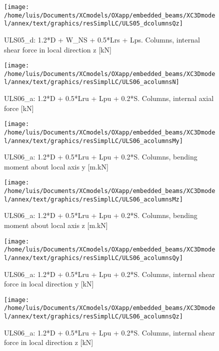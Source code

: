 \begin{figure}
\begin{center}
\texttt{[image: /home/luis/Documents/XCmodels/OXapp/embedded\_beams/XC3Dmodel/annex/text/graphics/resSimplLC/ULS05\_dcolumnsQz]}
\caption{ULS05_d: 1.2*D + W_NS + 0.5*Lrs + Lps. Columns, internal shear force in local direction z [kN]}
\end{center}
\end{figure}
\clearpage
\begin{figure}
\begin{center}
\texttt{[image: /home/luis/Documents/XCmodels/OXapp/embedded\_beams/XC3Dmodel/annex/text/graphics/resSimplLC/ULS06\_acolumnsN]}
\caption{ULS06_a: 1.2*D + 0.5*Lru + Lpu + 0.2*S. Columns, internal axial force [kN]}
\end{center}
\end{figure}
\begin{figure}
\begin{center}
\texttt{[image: /home/luis/Documents/XCmodels/OXapp/embedded\_beams/XC3Dmodel/annex/text/graphics/resSimplLC/ULS06\_acolumnsMy]}
\caption{ULS06_a: 1.2*D + 0.5*Lru + Lpu + 0.2*S. Columns, bending moment about local axis y [m.kN]}
\end{center}
\end{figure}
\begin{figure}
\begin{center}
\texttt{[image: /home/luis/Documents/XCmodels/OXapp/embedded\_beams/XC3Dmodel/annex/text/graphics/resSimplLC/ULS06\_acolumnsMz]}
\caption{ULS06_a: 1.2*D + 0.5*Lru + Lpu + 0.2*S. Columns, bending moment about local axis z [m.kN]}
\end{center}
\end{figure}
\begin{figure}
\begin{center}
\texttt{[image: /home/luis/Documents/XCmodels/OXapp/embedded\_beams/XC3Dmodel/annex/text/graphics/resSimplLC/ULS06\_acolumnsQy]}
\caption{ULS06_a: 1.2*D + 0.5*Lru + Lpu + 0.2*S. Columns, internal shear force in local direction y [kN]}
\end{center}
\end{figure}
\begin{figure}
\begin{center}
\texttt{[image: /home/luis/Documents/XCmodels/OXapp/embedded\_beams/XC3Dmodel/annex/text/graphics/resSimplLC/ULS06\_acolumnsQz]}
\caption{ULS06_a: 1.2*D + 0.5*Lru + Lpu + 0.2*S. Columns, internal shear force in local direction z [kN]}
\end{center}
\end{figure}

